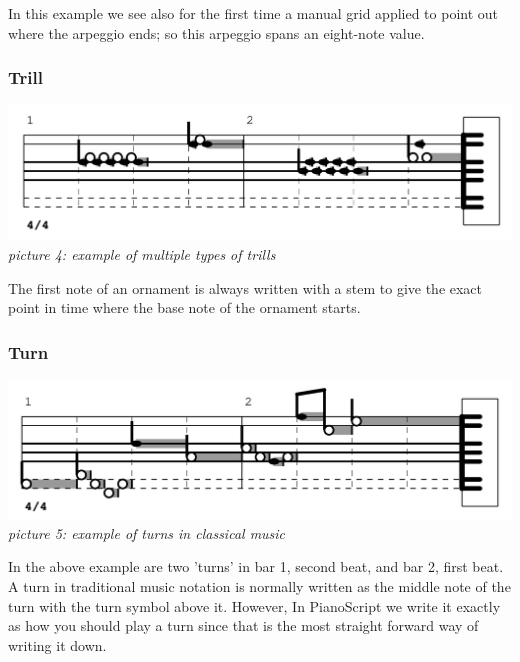\documentclass[11pt,a4paper]{article}
\begin{document}
In this example we see also for the first time a manual grid applied to point out where the arpeggio ends; so this arpeggio spans an eight-note value.

\subsubsection{Trill}
\begin{center}
\includegraphics[scale=.75]{images/trills.jpg}\\
\emph{\small picture 4: example of multiple types of trills} 
\end{center}

The first note of an ornament is always written with a stem to give the exact point in time where the base note of the ornament starts.

\subsubsection{Turn}
\begin{center}
\includegraphics[scale=.75]{images/turns.jpg}\\
\emph{\small picture 5: example of turns in classical music} 
\end{center}

In the above example are two 'turns' in bar 1, second beat, and bar 2, first beat. A turn in traditional music notation is normally written as the middle note of the turn with the turn symbol above it. However, In PianoScript we write it exactly as how you should play a turn since that is the most straight forward way of writing it down.

\end{document}
